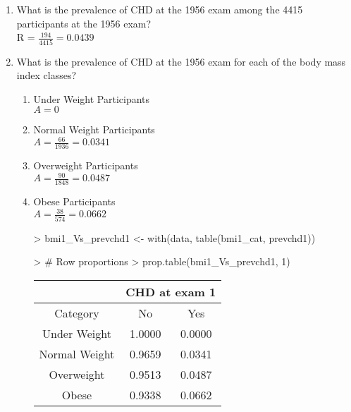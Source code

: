 \documentclass{article}
\begin{document}
\begin{enumerate}
  \item What is the prevalence of CHD at the 1956 exam among the 4415 participants at the 1956 exam?\\ R = \(\frac{194}{4415}= 0.0439\)\\
  \item What is the prevalence of CHD at the 1956 exam for each of the body mass index  classes? \\ 
  \begin{enumerate}
  \item Under Weight Participants\\
  \(A = 0\)\\
  \item Normal Weight Participants\\
  \(A = \frac{66}{1936}= 0.0341\) \\ 
  \item Overweight Participants\\
  \(A = \frac{90}{1848}= 0.0487\)\\
  \item Obese Participants\\
  \(A = \frac{38}{574}= 0.0662\)\\

\begin{Schunk}
\begin{Sinput}
> bmi1_Vs_prevchd1 <- with(data, table(bmi1_cat, prevchd1))
\end{Sinput}
\end{Schunk}
\begin{Schunk}
\begin{Sinput}
> # Row proportions
> prop.table(bmi1_Vs_prevchd1, 1)
\end{Sinput}
\end{Schunk}
\begin{table}[ht]
\begin{center}
\begin{tabular}{ccc}
& \multicolumn{2}{c}{CHD at exam 1}\\
  \hline
Category & No & Yes \\ 
  \hline
Under Weight & 1.0000 & 0.0000 \\ 
Normal Weight & 0.9659 & 0.0341 \\ 
Overweight & 0.9513 & 0.0487 \\ 
Obese & 0.9338 & 0.0662 \\ 
   \hline
\end{tabular}
\end{center}
\end{table}


\end{enumerate}


\end{enumerate}
\end{document}
